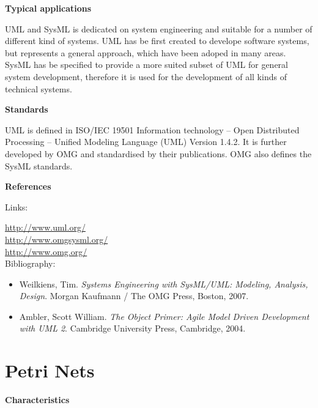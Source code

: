 \documentclass{./template/openetcs_report}
\begin{document}
	\textbf{Typical applications}

UML and SysML is dedicated on system engineering and suitable for a number of different kind of systems.
UML has be first created to develope software systems, but represents a general approach, which have been adoped in many areas. SysML has be specified to provide a more suited subset of UML for general system development, therefore it is used for the development of all kinds of technical systems.

	\textbf{Standards}

UML is defined in ISO/IEC 19501 Information technology -- Open Distributed Processing -- Unified Modeling Language (UML) Version 1.4.2. It is further developed by OMG and standardised by their publications. OMG also defines the SysML standards.

	\textbf{References}

Links:

\url{http://www.uml.org/} \\[4pt]
\url{http://www.omgsysml.org/}\\[4pt]
\url{http://www.omg.org/} \\[4pt]

Bibliography:
\begin{itemize}
\item Weilkiens, Tim. \textit{Systems Engineering with SysML/UML: Modeling, Analysis, Design}. Morgan Kaufmann / The OMG Press, Boston,  2007.\\[4pt]
\item Ambler, Scott William. \textit{The Object Primer: Agile Model Driven Development with UML 2}. Cambridge University Press, Cambridge, 2004.\\[4pt]
\end{itemize}

\section{Petri Nets}


	\textbf{Characteristics}
\end{document}
